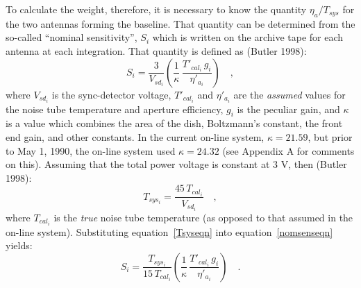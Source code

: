 \documentclass[11pt]{article}
\begin{document}
To calculate the weight, therefore, it is necessary to know the
quantity $\eta_a / T_{sys}$ for the two antennas forming the baseline.
That quantity can be determined from the so-called ``nominal
sensitivity'', $S_i$ which is written on the archive tape for each
antenna at each integration.  That quantity is defined as (Butler 1998):
\begin{equation}
\label{nomsenseqn}
   S_i = \frac{3}{V_{sd_i}}
         \left(
          \frac{1}{\kappa} \, \frac{T'_{cal_i} \, g_i}{\eta'_{a_i}}
         \right)
   \quad ,
\end{equation}
where $V_{sd_i}$ is the sync-detector voltage, $T'_{cal_i}$ and
$\eta'_{a_i}$ are the {\it assumed} values for the noise tube
temperature and aperture efficiency, $g_i$ is the peculiar gain, and
$\kappa$ is a value which combines the area of the dish, Boltzmann's
constant, the front end gain, and other constants.  In the current
on-line system, $\kappa = 21.59$, but prior to May 1, 1990, the on-line
system used $\kappa = 24.32$ (see Appendix A for comments on this).
Assuming that the total power voltage is constant at 3 V, then (Butler
1998):
\begin{equation}
   \label{Tsyseqn}
   T_{sys_i} = \frac{45 \, T_{cal_i}}{V_{sd_i}} \quad ,
\end{equation}
where $T_{cal_i}$ is the {\it true} noise tube temperature (as opposed
to that assumed in the on-line system).  Substituting
equation~\ref{Tsyseqn} into equation~\ref{nomsenseqn} yields:
\begin{equation}
\label{Sieqn}
   S_i = \frac{T_{sys_i}}{15 \, T_{cal_i}}
         \left(
          \frac{1}{\kappa} \, \frac{T'_{cal_i} \, g_i}{\eta'_{a_i}}
         \right)
   \quad .
\end{equation}
\end{document}
